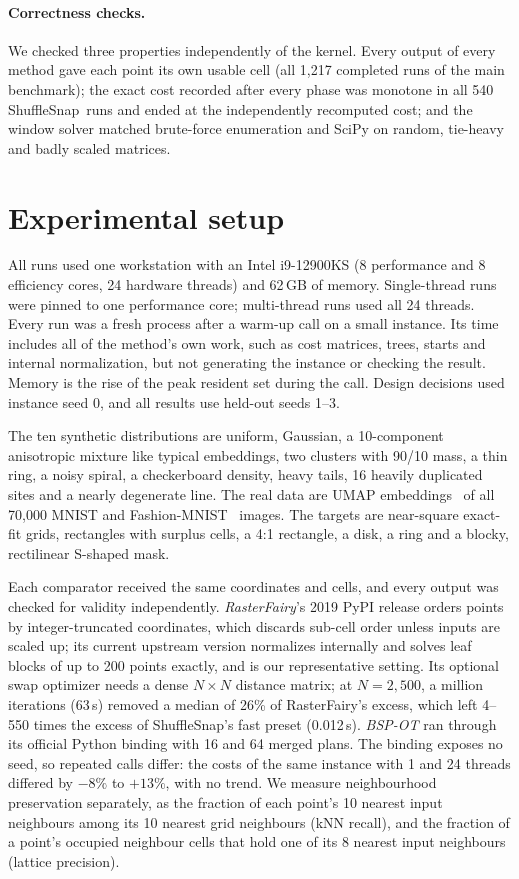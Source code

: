 \documentclass[11pt]{article}
\newcommand{\ShuffleSnap}{ShuffleSnap}
\begin{document}
\paragraph{Correctness checks.} We checked three properties independently of the kernel.
Every output of every method gave each point its own usable cell (all 1{,}217 completed runs of
the main benchmark); the exact cost recorded after every phase was monotone in all 540
\ShuffleSnap\ runs and ended at the independently recomputed cost; and the window solver
matched brute-force enumeration and SciPy on random, tie-heavy and badly scaled matrices.

\clearpage

\section{Experimental setup}
\label{sec:setup}

All runs used one workstation with an Intel i9-12900KS (8 performance and 8 efficiency
cores, 24 hardware threads) and 62\,GB of memory. Single-thread runs were pinned to one
performance core; multi-thread runs used all 24 threads. Every run was a fresh process after
a warm-up call on a small instance. Its time includes all of the method's own work, such as
cost matrices, trees, starts and internal normalization, but not generating the instance or
checking the result. Memory is the rise of the peak resident set during the call. Design
decisions used instance seed 0, and all results use held-out seeds 1--3.

The ten synthetic distributions are uniform, Gaussian, a 10-component anisotropic
mixture like typical embeddings, two clusters with 90/10 mass, a thin ring, a noisy spiral,
a checkerboard density, heavy tails, 16 heavily duplicated sites and a nearly degenerate line.
The real data are UMAP embeddings~\citep{mcinnes2018umap} of all 70{,}000 MNIST and
Fashion-MNIST~\citep{xiao2017fashion} images. The targets are near-square exact-fit grids,
rectangles with surplus cells, a 4:1 rectangle, a disk, a ring and a blocky, rectilinear
S-shaped mask.

Each comparator received the same coordinates and cells, and every output was checked for
validity independently. \emph{RasterFairy}'s 2019 PyPI release orders points by
integer-truncated coordinates, which discards sub-cell order unless inputs are scaled up; its
current upstream version normalizes internally and solves leaf blocks of up to 200 points
exactly, and is our representative setting. Its optional swap optimizer needs a dense
$N\times N$ distance matrix; at $N=2{,}500$, a million iterations (63\,s) removed a median of
26\% of RasterFairy's excess, which left 4--550 times the excess of \ShuffleSnap's fast preset
(0.012\,s). \emph{BSP-OT} ran through its official Python
binding with 16 and 64 merged plans. The binding exposes no seed, so repeated calls differ:
the costs of the same instance with 1 and 24 threads differed by $-8\%$ to $+13\%$, with no
trend. We measure neighbourhood preservation separately, as the fraction of each point's 10
nearest input neighbours among its 10 nearest grid neighbours (kNN recall), and the fraction
of a point's occupied neighbour cells that hold one of its 8 nearest input neighbours
(lattice precision).
\end{document}
